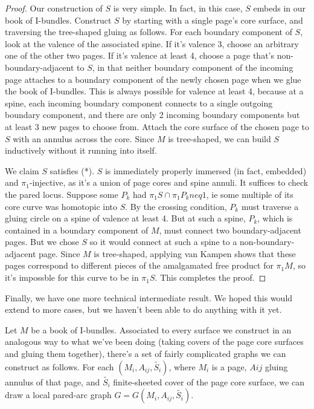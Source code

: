 \documentclass[12pt]{amsart}
\theoremstyle{definition}
\begin{document}
\begin{proof}

Our construction of $S$ is very simple. In fact, in this case, $S$ embeds in
our book of I-bundles. Construct $S$ by starting with a single page's core
surface, and traversing the tree-shaped gluing as follows. For each boundary
component of $S$, look at the valence of the associated spine. If it's valence
3, choose an arbitrary one of the other two pages. If it's valence at least 4,
choose a page that's non-boundary-adjacent to $S$, in that neither boundary
component of the incoming page attaches to a boundary component of the newly
chosen page when we glue the book of I-bundles. This is always possible for
valence at least 4, because at a spine, each incoming boundary component
connects to a single outgoing boundary component, and there are only 2 incoming
boundary components but at least 3 new pages to choose from. Attach the core
surface of the chosen page to $S$ with an annulus across the core. Since $M$ is
tree-shaped, we can build $S$ inductively without it running into itself.

We claim $S$ satisfies (*). $S$ is immediately properly immersed (in fact,
embedded) and $\pi_1$-injective, as it's a union of page cores and spine
annuli. It suffices to check the pared locus. Suppose some $P_k$ had $\pi_1S
\cap \pi_1P_k neq 1$, ie some multiple of its core curve was homotopic into
$S$. By the crossing condition, $P_k$ must traverse a gluing circle on a spine
of valence at least 4.  But at such a spine, $P_k$, which is contained in
a boundary component of $M$, must connect two boundary-adjacent pages. But we
chose $S$ so it would connect at such a spine to a non-boundary-adjacent page.
Since $M$ is tree-shaped, applying van Kampen shows that these pages correspond
to different pieces of the amalgamated free product for $\pi_1M$, so it's
impossble for this curve to be in $\pi_1S$. This completes the proof.

\end{proof}

Finally, we have one more technical intermediate result. We hoped this would
extend to more cases, but we haven't been able to do anything with it yet.

Let $M$ be a book of I-bundles. Associated to every surface we construct in an
analogous way to what we've been doing (taking covers of the page core surfaces
and gluing them together), there's a set of fairly complicated graphs we can
construct as follows. For each $(M_i,A_{ij},\widetilde{S_i})$, where $M_i$ is
a page, $Aij$ gluing annulus of that page, and $\widetilde{S_i}$ finite-sheeted
cover of the page core surface, we can draw a local pared-arc graph
$G=G(M_i,A_{ij},\widetilde{S_i})$.
\end{document}
